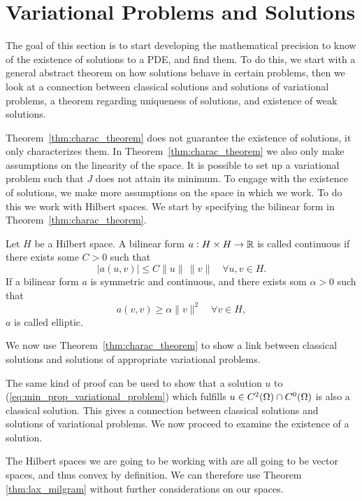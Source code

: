 \section{Variational Problems and Solutions}
The goal of this section is to start developing the mathematical 
precision to know of the existence of solutions to a PDE, and find 
them. 
To do this, we start with a general abstract theorem on how solutions 
behave in certain problems, then we look at a connection between 
classical solutions and solutions of variational problems, a 
theorem regarding uniqueness of solutions, and existence of 
weak solutions.


Theorem~\ref{thm:charac_theorem} does not guarantee the existence 
of solutions, it only characterizes them. In Theorem~\ref{thm:charac_theorem} we 
also only make assumptions on the linearity of the space. 
It is possible to set up a variational problem such that $J$ does 
not attain its minimum.
To engage with the existence of solutions, we make more assumptions on 
the space in which we work. To do this we work with Hilbert spaces. 
We start by specifying the bilinear form in Theorem~\ref{thm:charac_theorem}.
\begin{defn}{\quad}
   Let $H$ be a Hilbert space. A bilinear form $a : H \times H \to \mathbb{R}$ is 
   called continuous if there exists some $C > 0$ such that 
   \begin{equation}
    |a(u,v)| \leq C \|u\|\, \|v\| \quad \forall u,v \in H.
   \end{equation} 
   If a bilinear form $a$ is symmetric and continuous, and there exists som $\alpha >0$ such that 
   \begin{equation*}
    a(v,v) \geq \alpha \|v\|^2 \quad \forall v \in H,
   \end{equation*}
   $a$ is called elliptic.
 \end{defn}
We now use Theorem~\ref{thm:charac_theorem} to show a link between classical 
solutions and solutions of appropriate variational problems.

The same kind of proof can be used to show that a solution $u$ to 
(\ref{eq:min_prop_variational_problem}) which fulfills 
$u\in C^2(\Omega) \cap C^0(\Omega)$ is also a classical solution. 
This gives a connection between classical solutions and solutions of 
variational problems. We now proceed to examine the existence of a 
solution.

The Hilbert spaces we are going to be working with are all going to be 
vector spaces, and thus convex by definition. 
We can therefore use Theorem \ref{thm:lax_milgram} without further considerations 
on our spaces.

